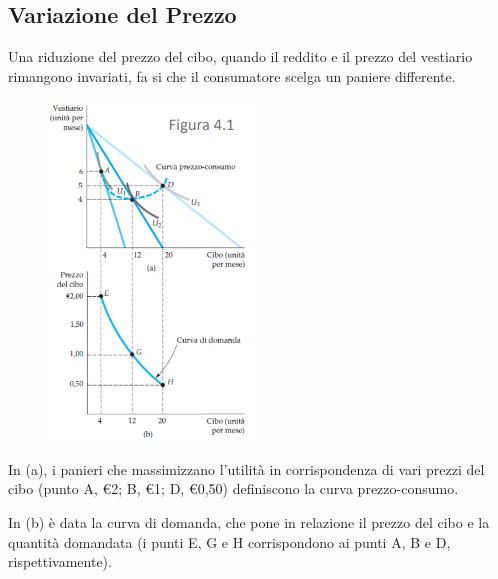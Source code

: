 \documentclass[12pt]{article}
\begin{document}
\subsection{Variazione del Prezzo}
Una riduzione del prezzo del cibo, quando il reddito e il prezzo del
vestiario rimangono invariati, fa si che il consumatore scelga un
paniere differente.
\FloatBarrier
\begin{figure}[!htb]
    \centering
    \includegraphics[width=0.5\textwidth]{images/domind.png}
\end{figure}
\FloatBarrier
In (a), i panieri che massimizzano l’utilità in corrispondenza di vari
prezzi del cibo (punto A, €2; B, €1; D, €0,50) definiscono la curva
prezzo-consumo.

In (b) è data la curva di domanda, che pone in relazione il prezzo
del cibo e la quantità domandata (i punti E, G e H corrispondono ai
punti A, B e D, rispettivamente).
\end{document}
